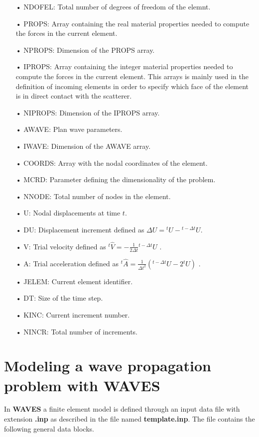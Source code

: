 \documentclass[12pt,letterpaper]{article}
\begin{document}
\begin{itemize}
\item[•] NDOFEL: Total number of degrees of freedom of the elemnt.
\item[•] PROPS: Array containing the real material properties needed to compute the forces in the current element.
\item[•] NPROPS: Dimension of the PROPS array.
\item[•] IPROPS: Array containing the integer material properties needed to compute the forces in the current element. This arrays is mainly used in the definition of incoming elements in order to specify which face of the element is in direct contact with the scatterer.
\item[•] NIPROPS: Dimension of the IPROPS array.
\item[•] AWAVE: Plan wave parameters.
\item[•] IWAVE: Dimension of the AWAVE array.
\item[•] COORDS: Array with the nodal coordinates of the element.
\item[•] MCRD: Parameter defining the dimensionality of the problem.
\item[•] NNODE: Total number of nodes in the element.
\item[•] U: Nodal displacements at time $t$.
\item[•] DU: Displacement increment defined as $\Delta U = {}^tU - {}^{t - \Delta t}U$.
\item[•] V: Trial velocity defined as ${}^t\hat V =  - \frac{1}{{2\Delta t}}{}^{t - \Delta t}U$ .
\item[•] A: Trial acceleration defined as ${}^t\hat A  = \frac{1}{{\Delta {t^2}}}\left( {{}^{t - \Delta t}U - 2{}^tU} \right)$ .
\item[•] JELEM: Current element identifier.
\item[•] DT: Size of the time step.
\item[•] KINC: Current increment number.
\item[•] NINCR: Total number of increments.
\end{itemize}


\section{Modeling a wave propagation problem with WAVES}

In {\bf WAVES} a finite element model is defined through an input data file with extension {\bf .inp} as described in the file named {\bf template.inp}. The file contains the following general data blocks.
\end{document}
